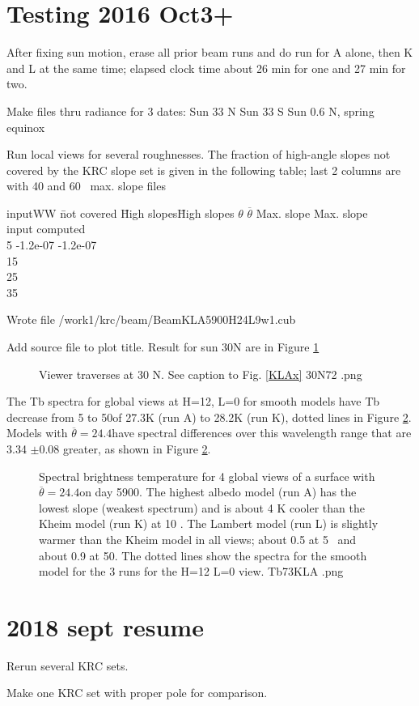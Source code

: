 \documentclass{article}
\begin{document}

 \section{Testing 2016 Oct3+}
After fixing sun motion, erase all prior beam runs and do run for A alone, then
K and L at the same time; elapsed clock time about 26 min for one and 27 min for
two.

Make files thru radiance for 3 dates:
 Sun 33 N
 Sun 33 S
 Sun 0.6 N, spring equinox

 Run local views for several roughnesses. The fraction of high-angle slopes not
 covered by the KRC slope set is given in the following table; last 2 columns are
 with 40 and 60\qd~ max. slope files
\begin{tabbing}
inputWW \= not covered \=  High slopes\= High slopes \kill
$\theta$ \> $\overline{\theta}$ \> Max. slope \>  Max. slope \\
input   \> computed \qd  {}\qd \\
5   \> -1.2e-07 \>  -1.2e-07 \\
15    \\
25      \\
35   \>      \\
\end{tabbing}

 Wrote file /work1/krc/beam/BeamKLA5900H24L9w1.cub

Add source file to plot title. Result for sun 30N are in Figure 
\ref{30N72}
\begin{figure}[!ht] 
\caption[Beam profiles with Sun 30N]{Viewer traverses at 30 N. See caption to Fig. \ref{KLAx}
\label{30N72} 30N72 .png  }
\end{figure} 

 The Tb spectra for global views at H=12, L=0 for smooth models have Tb decrease
 from 5 to 50\um of 27.3K (run A) to 28.2K (run K), dotted lines in Figure
 \ref{Tb73KLA}.  Models with $\overline{\theta}=24.4$\qd have spectral
 differences over this wavelength range that are 3.34 $\pm$0.08 greater, as
 shown in Figure \ref{Tb73KLA}.

\begin{figure}[!ht] 
\caption[Global Tb]{Spectral brightness temperature for 4 global views of a
  surface with $\overline{\theta}=24.4$\qd on day 5900. The highest albedo model
  (run A) has the lowest slope (weakest spectrum) and is about 4 K cooler than
  the Kheim model (run K) at 10 \um. The Lambert model (run L) is slightly
  warmer than the Kheim model in all views; about 0.5 at 5\um~ and about 0.9 at
  50\um. The dotted lines show the spectra for the smooth model for the 3 runs
  for the H=12 L=0 view.
\label{Tb73KLA} Tb73KLA .png  }
\end{figure} 

 \section{2018 sept resume}

Rerun several KRC sets. 

Make one KRC set with proper pole for comparison.
\end{document}
